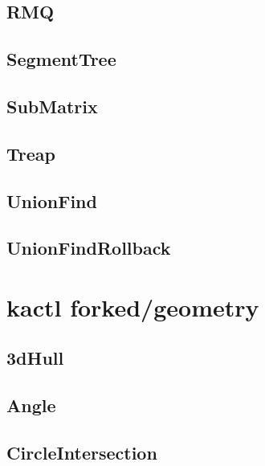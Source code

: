 \subsection{RMQ}
\raggedbottom
\hrulefill
\subsection{SegmentTree}
\raggedbottom
\hrulefill
\subsection{SubMatrix}
\raggedbottom
\hrulefill
\subsection{Treap}
\raggedbottom
\hrulefill
\subsection{UnionFind}
\raggedbottom
\hrulefill
\subsection{UnionFindRollback}
\raggedbottom
\hrulefill

\section{kactl forked/geometry}
\subsection{3dHull}
\raggedbottom
\hrulefill
\subsection{Angle}
\raggedbottom
\hrulefill
\subsection{CircleIntersection}
\raggedbottom
\hrulefill
